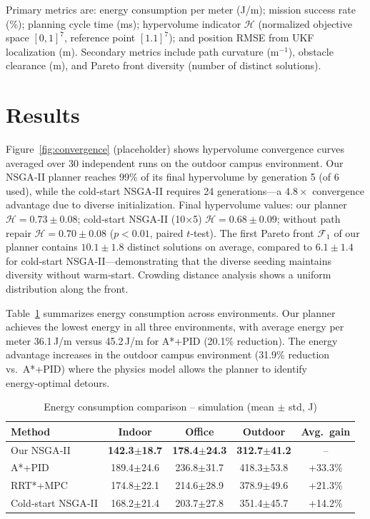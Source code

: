 \documentclass[lettersize,journal]{IEEEtran}
\begin{document}
Primary metrics are: energy consumption per meter (J/m); mission success
rate (\%); planning cycle time (ms); hypervolume indicator $\mathcal{H}$
(normalized objective space $[0,1]^7$, reference point $[1.1]^7$); and
position RMSE from UKF localization (m). Secondary metrics include path
curvature (m$^{-1}$), obstacle clearance (m), and Pareto front diversity
(number of distinct solutions).

\section{Results}
\label{sec:results}

Figure~\ref{fig:convergence} (placeholder) shows hypervolume convergence
curves averaged over 30 independent runs on the outdoor campus environment.
Our NSGA‑II planner reaches 99\% of its final hypervolume by generation 5
(of 6 used), while the cold‑start NSGA‑II requires 24 generations—a
$4.8\times$ convergence advantage due to diverse initialization. Final
hypervolume values: our planner $\mathcal{H}=0.73\pm0.08$; cold‑start NSGA‑II
(10$\times$5) $\mathcal{H}=0.68\pm0.09$; without path repair
$\mathcal{H}=0.70\pm0.08$ ($p<0.01$, paired $t$‑test). The first Pareto
front $\mathcal{F}_1$ of our planner contains $10.1\pm1.8$ distinct solutions
on average, compared to $6.1\pm1.4$ for cold‑start NSGA‑II—demonstrating that
the diverse seeding maintains diversity without warm‑start. Crowding distance
analysis shows a uniform distribution along the front.

Table~\ref{tab:sim_energy} summarizes energy consumption across environments.
Our planner achieves the lowest energy in all three environments, with average
energy per meter 36.1\,J/m versus 45.2\,J/m for A*+PID (20.1\% reduction).
The energy advantage increases in the outdoor campus environment (31.9\%
reduction vs.\ A*+PID) where the physics model allows the planner to identify
energy‑optimal detours.

\begin{table}[t]
\centering
\caption{Energy consumption comparison -- simulation (mean $\pm$ std, J)}
\label{tab:sim_energy}
\begin{tabular}{lcccc}
\toprule
\textbf{Method} & \textbf{Indoor} & \textbf{Office} & \textbf{Outdoor}
                & \textbf{Avg.\ gain} \\
\midrule
Our NSGA‑II    & \textbf{142.3$\pm$18.7} & \textbf{178.4$\pm$24.3}
                & \textbf{312.7$\pm$41.2} & -- \\
A*+PID          & 189.4$\pm$24.6 & 236.8$\pm$31.7 & 418.3$\pm$53.8
                & +33.3\% \\
RRT*+MPC        & 174.8$\pm$22.1 & 214.6$\pm$28.9 & 378.9$\pm$49.6
                & +21.3\% \\
Cold‑start NSGA‑II & 168.2$\pm$21.4 & 203.7$\pm$27.8 & 351.4$\pm$45.7
                   & +14.2\% \\
\bottomrule
\end{tabular}
\end{table}
\end{document}
